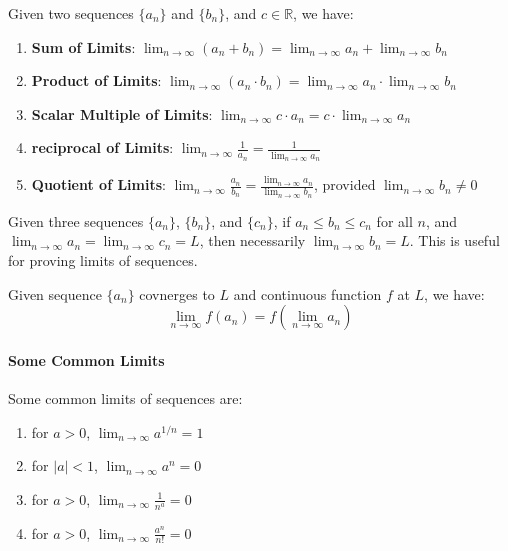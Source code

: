 \documentclass[11pt]{report}
\begin{document}
\begin{theorem}
    Given two sequences $\{a_n\}$ and $\{b_n\}$, and $c \in \mathbb{R}$, we have:
    \begin{enumerate}
        \item \textbf{Sum of Limits}: $\lim_{n \to \infty} (a_n + b_n) = \lim_{n \to \infty} a_n + \lim_{n \to \infty} b_n$
        \item \textbf{Product of Limits}: $\lim_{n \to \infty} (a_n \cdot b_n) = \lim_{n \to \infty} a_n \cdot \lim_{n \to \infty} b_n$
        \item \textbf{Scalar Multiple of Limits}: $\lim_{n \to \infty} c \cdot a_n = c \cdot \lim_{n \to \infty} a_n$
        \item \textbf{reciprocal of Limits}: $\lim_{n \to \infty} \frac{1}{a_n} = \frac{1}{\lim_{n \to \infty} a_n}$
        \item \textbf{Quotient of Limits}: $\lim_{n \to \infty} \frac{a_n}{b_n} = \frac{\lim_{n \to \infty} a_n}{\lim_{n \to \infty} b_n}$, provided $\lim_{n \to \infty} b_n \neq 0$
    \end{enumerate}
\end{theorem}
\begin{theorem}
    Given three sequences $\{a_n\}$, $\{b_n\}$, and $\{c_n\}$, if $a_n \le b_n \le c_n$ for all $n$, and $\lim_{n \to \infty} a_n = \lim_{n \to \infty} c_n = L$, then necessarily $\lim_{n \to \infty} b_n = L$. This is useful for proving limits of sequences.
\end{theorem}
\begin{theorem}
    Given sequence $\{a_n\}$ covnerges to $L$ and continuous function $f$ at $L$, we have:
    \begin{equation}
        \lim_{n \to \infty} f(a_n) = f(\lim_{n \to \infty} a_n)
    \end{equation}
\end{theorem}
\paragraph{Some Common Limits} Some common limits of sequences are:
\begin{enumerate}
    \item for $a > 0$, $\lim_{n \to \infty} a^{1/n} = 1$
    \item for $|a| < 1$, $\lim_{n \to \infty} a^n = 0$
    \item for $a > 0$, $\lim_{n \to \infty} \frac{1}{n^a} = 0$
    \item for $a > 0$, $\lim_{n \to \infty} \frac{a^n}{n!} = 0$
\end{enumerate}
\end{document}
